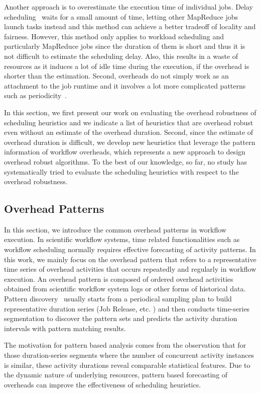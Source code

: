 Another approach is to overestimate the execution time of individual jobs. Delay scheduling~\cite{Zaharia2010} waits for a small amount of time, letting other MapReduce jobs launch tasks instead and this method can achieve a better tradeoff of locality and fairness. However, this method only applies to workload scheduling and particularly MapReduce jobs since the duration of them is short and thus it is not difficult to estimate the scheduling delay. Also, this results in a waste of resources as it induces a lot of idle time during the execution, if the overhead is shorter than the estimation. Second, overheads do not simply work as an attachment to the job runtime and it involves a lot more complicated patterns such as periodicity~\cite{Chen2011}. 

In this section, we first present our work on evaluating the overhead robustness of scheduling heuristics and we indicate a list of heuristics that are overhead robust even without an estimate of the overhead duration. Second, since the estimate of overhead duration is difficult, we develop new heuristics that leverage the pattern information of workflow overheads, which represents a new approach to design overhead robust algorithms. To the best of our knowledge, so far, no study has systematically tried to evaluate the scheduling heuristics with respect to the overhead robustness.  



\subsection{Overhead Patterns}

In this section, we introduce the common overhead patterns in workflow execution. 
In scientific workflow systems, time related functionalities such as workflow scheduling normally requires effective forecasting of activity patterns. In this work, we mainly focus on the overhead pattern that refers to a representative time series of overhead activities that occurs repeatedly and regularly in workflow execution. An overhead pattern is composed of ordered overhead activities obtained from scientific workflow system logs or other forms of historical data. 
Pattern discovery~\cite{Liu2008} usually starts from a periodical sampling plan to build representative duration series (Job Release, etc. ) and then conducts time-series segmentation to discover the pattern sets and predicts the activity duration intervals with pattern matching results. 


The motivation for pattern based analysis comes from the observation that for those duration-series segments where the number of concurrent activity instances is similar, these activity durations reveal comparable statistical features. Due to the dynamic nature of underlying resources, pattern based forecasting of overheads can improve the effectiveness of scheduling heuristics. 


